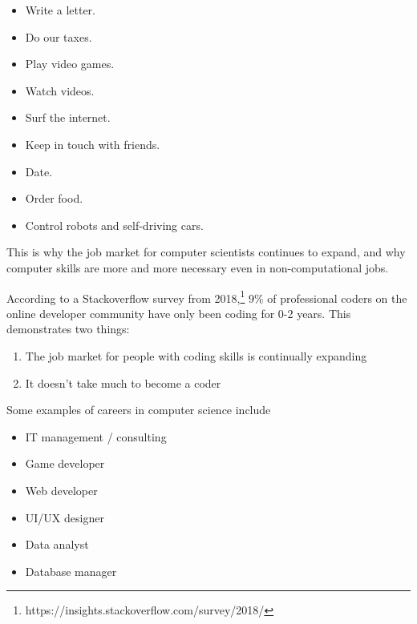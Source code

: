 \begin{itemize}
	\item Write a letter.
	\item Do our taxes.
	\item Play video games.
	\item Watch videos.
	\item Surf the internet.
	\item Keep in touch with friends.
	\item Date.
	\item Order food.
	\item Control robots and self-driving cars.
\end{itemize}

This is why the job market for computer scientists continues to expand, and why computer skills are more and more necessary even in non-computational jobs.

According to a Stackoverflow survey from 2018,\footnote{https://insights.stackoverflow.com/survey/2018/} 9\% of professional coders on the online developer community have only been coding for 0-2 years. This demonstrates two things:

\begin{enumerate}
	\item The job market for people with coding skills is continually expanding
	\item It doesn't take much to become a coder
\end{enumerate}

Some examples of careers in computer science include

\begin{itemize}
\item IT management / consulting
\item Game developer
\item Web developer
\item UI/UX designer
\item Data analyst
\item Database manager
\end{itemize}

\exercisesection

